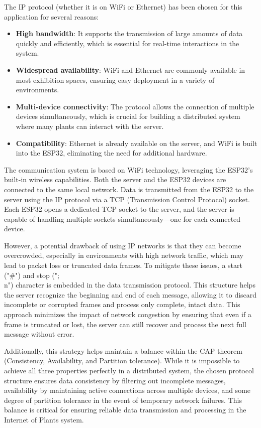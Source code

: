 The IP protocol (whether it is on WiFi or Ethernet) has been chosen for this application for several reasons:

\begin{itemize}
    \item \textbf{High bandwidth}: It supports the transmission of large amounts of data quickly and efficiently, which is essential for real-time interactions in the system.
    \item \textbf{Widespread availability}: WiFi and Ethernet are commonly available in most exhibition spaces, ensuring easy deployment in a variety of environments.
    \item \textbf{Multi-device connectivity}: The protocol allows the connection of multiple devices simultaneously, which is crucial for building a distributed system where many plants can interact with the server.
    \item \textbf{Compatibility}: Ethernet is already available on the server, and WiFi is built into the ESP32, eliminating the need for additional hardware.
\end{itemize}

The communication system is based on WiFi technology, leveraging the ESP32's built-in wireless capabilities. Both the server and the ESP32 devices are connected to the same local network. Data is transmitted from the ESP32 to the server using the IP protocol via a TCP (Transmission Control Protocol) socket. Each ESP32 opens a dedicated TCP socket to the server, and the server is capable of handling multiple sockets simultaneously—one for each connected device.

However, a potential drawback of using IP networks is that they can become overcrowded, especially in environments with high network traffic, which may lead to packet loss or truncated data frames. To mitigate these issues, a start ("#") and stop (";\\n") character is embedded in the data transmission protocol. This structure helps the server recognize the beginning and end of each message, allowing it to discard incomplete or corrupted frames and process only complete, intact data. This approach minimizes the impact of network congestion by ensuring that even if a frame is truncated or lost, the server can still recover and process the next full message without error.

Additionally, this strategy helps maintain a balance within the CAP theorem (Consistency, Availability, and Partition tolerance). While it is impossible to achieve all three properties perfectly in a distributed system, the chosen protocol structure ensures data consistency by filtering out incomplete messages, availability by maintaining active connections across multiple devices, and some degree of partition tolerance in the event of temporary network failures. This balance is critical for ensuring reliable data transmission and processing in the Internet of Plants system.



